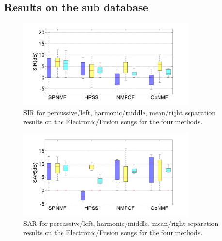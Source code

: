 \subsection{Results on the sub database}
\label{appendix:sub_database}

\begin{figure}[H]
  \centering 
  \includegraphics[width=9cm]{fig/ElectroFusionSIR}
  \caption{\label{ElectroFusionSIR} SIR for percussive/left, harmonic/middle, mean/right separation results on the Electronic/Fusion songs for the four methods.} 
\end{figure}

\begin{figure}[H]
  \centering 
  \includegraphics[width=9cm]{fig/ElectroFusionSAR}
  \caption{\label{ElectroFusionSAR} SAR for percussive/left, harmonic/middle, mean/right separation results on the Electronic/Fusion songs for the four methods.}
\end{figure}
